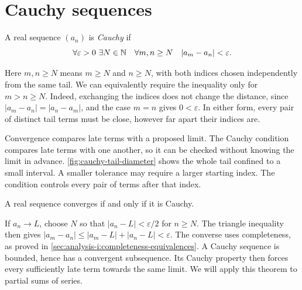 \section{Cauchy sequences}

\label{sec:analysis-i:cauchy-sequences}

\begin{definition}
  A real sequence $(a_n)$ is \emph{Cauchy} if
  \[
    \forall\varepsilon>0\ \exists N\in\mathbb{N}\quad
    \forall m,n\ge N\quad |a_m-a_n|<\varepsilon.
  \]
\end{definition}

Here $m,n\ge N$ means $m\ge N$ and $n\ge N$, with both indices
chosen independently from the same tail. We can equivalently require
the inequality only for $m>n\ge N$. Indeed, exchanging the indices
does not change the distance, since $|a_m-a_n|=|a_n-a_m|$, and
the case $m=n$ gives $0<\varepsilon$. In either form, every pair of
distinct tail terms must be close, however far apart their indices are.

\begin{marginfigure}
  \centering
  
  \caption[Whole Cauchy tails in shrinking intervals.]{Schematic real-line views of two tails, with
    $\varepsilon_2<\varepsilon_1$. Each shaded interval contains a
    whole tail and is narrower than its indicated tolerance, so
    every pair of terms in that tail is close. Dots show sample terms.}
  \label{fig:cauchy-tail-diameter}
\end{marginfigure}

Convergence compares late terms with a proposed limit. The Cauchy
condition compares late terms with one another, so it can be checked
without knowing the limit in advance.
\autoref{fig:cauchy-tail-diameter} shows the whole tail confined to a
small interval. A smaller tolerance may require a larger starting index.
The condition controls every pair of terms after that index.

\begin{theorem}
  \label{thm:analysis-i:cauchy-completeness}
  A real sequence converges if and only if it is Cauchy.
\end{theorem}

If $a_n\to L$, choose $N$ so that $|a_n-L|<\varepsilon/2$ for
$n\ge N$. The triangle inequality then gives
$|a_m-a_n|\le|a_m-L|+|a_n-L|<\varepsilon$.
The converse uses completeness, as proved in
\autoref{sec:analysis-i:completeness-equivalences}. A Cauchy sequence
is bounded, hence has a convergent subsequence. Its Cauchy property
then forces every sufficiently late term towards the same limit.
We will apply this theorem to partial sums of series.
